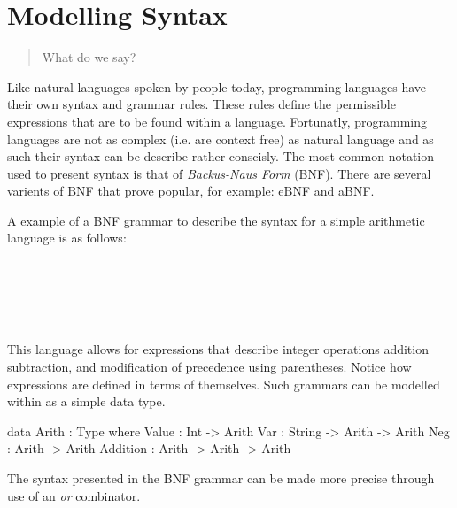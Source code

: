 \section{Modelling Syntax}
\label{sec:notation}
\begin{quote}
  What do we say?
\end{quote}

Like natural languages spoken by people today, programming languages have their own syntax and grammar rules.
These rules define the permissible expressions that are to be found within a language.
Fortunatly, programming languages are not as complex (i.e. are context free) as natural language and as such their syntax can be describe rather conscisly.
The most common notation used to present syntax is that of \emph{Backus-Naus Form} (BNF).
There are several varients of BNF that prove popular, for example: eBNF and aBNF.

A example of a BNF grammar to describe the syntax for a simple arithmetic language \allang{} is as follows:

\begin{bnf}
\\
\\
\\
\\
\end{bnf}

This language allows for expressions that describe integer operations addition subtraction, and modification of precedence using parentheses.
Notice how expressions are defined in terms of themselves.
Such grammars can be modelled within \idris{} as a simple data type.

\begin{code}
data Arith : Type where
  Value    : Int             -> Arith
  Var      : String -> Arith -> Arith
  Neg      : Arith           -> Arith
  Addition : Arith  -> Arith -> Arith
\end{code}


The syntax presented in the BNF grammar can be made more precise through use of an \emph{or} combinator.

\begin{bnf}
\end{bnf}

